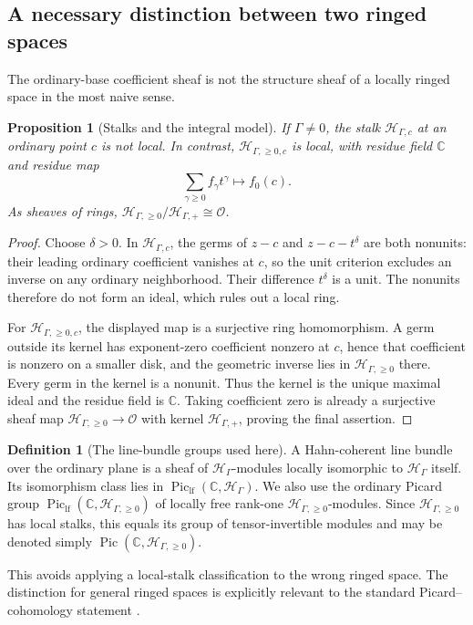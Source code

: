 \documentclass[11pt,letterpaper]{article}
\newtheorem{proposition}[theorem]{Proposition}
\theoremstyle{definition}
\newtheorem{definition}[theorem]{Definition}
\theoremstyle{remark}
\newcommand{\C}{\mathbb C}
\newcommand{\OO}{\mathcal O}
\newcommand{\HH}{\mathscr H_\Gamma}
\newcommand{\HP}{\mathscr H_{\Gamma,+}}
\newcommand{\HA}{\mathscr H_{\Gamma,\ge0}}
\newcommand{\Piclf}{\operatorname{Pic}_{\mathrm{lf}}}
\numberwithin{equation}{section}
\begin{document}
\subsection{A necessary distinction between two ringed spaces}
The ordinary-base coefficient sheaf is not the structure sheaf of a locally ringed space in the most naive sense.
\begin{proposition}[Stalks and the integral model]\label{prop:nonlocal}
If $\Gamma\ne0$, the stalk $\mathscr H_{\Gamma,c}$ at an ordinary point $c$ is not local. In contrast, $\mathscr H_{\Gamma,\ge0,c}$ is local, with residue field $\C$ and residue map
\[
 \sum_{\gamma\ge0}f_\gamma t^\gamma\longmapsto f_0(c).
\]
As sheaves of rings, $\HA/\HP\cong\OO$.
\end{proposition}
\begin{proof}
Choose $\delta>0$. In $\mathscr H_{\Gamma,c}$, the germs of $z-c$ and $z-c-t^\delta$ are both nonunits: their leading ordinary coefficient vanishes at $c$, so the unit criterion excludes an inverse on any ordinary neighborhood. Their difference $t^\delta$ is a unit. The nonunits therefore do not form an ideal, which rules out a local ring.

For $\mathscr H_{\Gamma,\ge0,c}$, the displayed map is a surjective ring homomorphism. A germ outside its kernel has exponent-zero coefficient nonzero at $c$, hence that coefficient is nonzero on a smaller disk, and the geometric inverse lies in $\HA$ there. Every germ in the kernel is a nonunit. Thus the kernel is the unique maximal ideal and the residue field is $\C$. Taking coefficient zero is already a surjective sheaf map $\HA\to\OO$ with kernel $\HP$, proving the final assertion.
\end{proof}

\begin{definition}[The line-bundle groups used here]
A Hahn-coherent line bundle over the ordinary plane is a sheaf of $\HH$-modules locally isomorphic to $\HH$ itself. Its isomorphism class lies in $\Piclf(\C,\HH)$. We also use the ordinary Picard group $\Piclf(\C,\HA)$ of locally free rank-one $\HA$-modules. Since $\HA$ has local stalks, this equals its group of tensor-invertible modules and may be denoted simply $\operatorname{Pic}(\C,\HA)$.
\end{definition}
This avoids applying a local-stalk classification to the wrong ringed space. The distinction for general ringed spaces is explicitly relevant to the standard Picard--cohomology statement \cite[Tag~09NT]{Stacks}.
\end{document}
